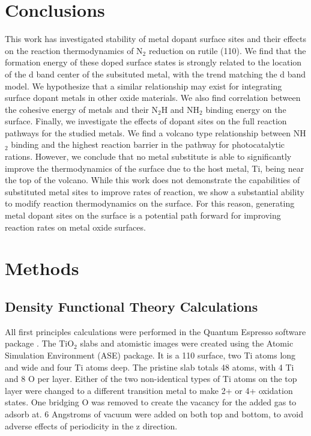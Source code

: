 \documentclass[catalysts,article,submit,moreauthors,pdftex,10pt,a4paper]{mdpi}
\theoremstyle{mdpi}
\newcounter{ex}
\newcounter{re}
\theoremstyle{mdpidefinition}
\begin{document}
\section{Conclusions}
This work has investigated stability of metal dopant surface sites and their effects on the reaction thermodynamics of N$_2$ reduction on rutile (110). We find that the formation energy of these doped surface states is strongly related to the location of the d band center of the subsituted metal, with the trend matching the d band model. We hypothesize that a similar relationship may exist for integrating surface dopant metals in other oxide materials. We also find correlation between the cohesive energy of metals and their N$_2$H and NH$_2$ binding energy on the surface. Finally, we investigate the effects of dopant sites on the full reaction pathways for the studied metals. We find a volcano type relationship between NH$_2$ binding and the highest reaction barrier in the pathway for photocatalytic rations. However, we conclude that no metal substitute is able to significantly improve the thermodynamics of the surface due to the host metal, Ti, being near the top of the volcano. While this work does not demonstrate the capabilities of substituted metal sites to improve rates of reaction, we show a substantial ability to modify reaction thermodynamics on the surface. For this reason, generating metal dopant sites on the surface is a potential path forward for improving reaction rates on metal oxide surfaces.


\section{Methods}
\subsection{Density Functional Theory Calculations}
All first principles calculations were performed in the Quantum Espresso software package \cite{QE-2009}.
The TiO$_2$ slabs and atomistic images were created using the Atomic Simulation Environment (ASE) package\cite{Hjorth_Larsen_2017}. It is a 110 surface, two Ti atoms long and wide and four Ti atoms deep. The pristine slab totals 48 atoms, with 4 Ti and 8 O per layer. Either of the two non-identical types of Ti atoms on the top layer were changed to a different transition metal to make 2+ or 4+ oxidation states. One bridging O was removed to create the vacancy for the added gas to adsorb at. 6 Angstroms of vacuum were added on both top and bottom, to avoid adverse effects of periodicity in the z direction.
\end{document}
